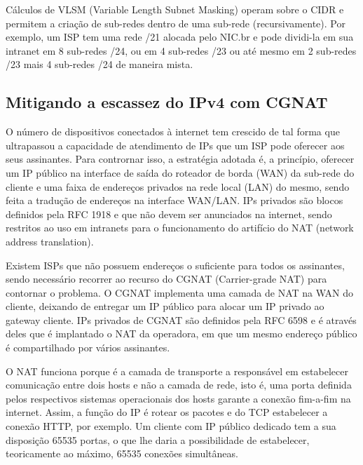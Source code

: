     Cálculos de VLSM (Variable Length Subnet Masking) operam sobre o CIDR e permitem a criação de sub-redes dentro de uma sub-rede (recursivamente). Por exemplo, um ISP tem uma rede /21 alocada pelo NIC.br e pode dividi-la em sua intranet em 8 sub-redes /24, ou em 4 sub-redes /23 ou até mesmo em 2 sub-redes /23 mais 4 sub-redes /24 de maneira mista.

\subsection{Mitigando a escassez do IPv4 com CGNAT}

    O número de dispositivos conectados à internet tem crescido de tal forma que ultrapassou a capacidade de atendimento de IPs que um ISP pode oferecer aos seus assinantes. Para contrornar isso, a estratégia adotada é, a princípio, oferecer um IP público na interface de saída do roteador de borda (WAN) da sub-rede do cliente e uma faixa de endereços privados na rede local (LAN) do mesmo, sendo feita a tradução de endereços na interface WAN/LAN. IPs privados são blocos definidos pela RFC 1918 e que não devem ser anunciados na internet, sendo restritos ao uso em intranets para o funcionamento do artifício do NAT (network address translation).
    
    Existem ISPs que não possuem endereços o suficiente para todos os assinantes, sendo necessário recorrer ao recurso do CGNAT (Carrier-grade NAT) para contornar o problema. O CGNAT implementa uma camada de NAT na WAN do cliente, deixando de entregar um IP público para alocar um IP privado ao gateway cliente. IPs privados de CGNAT são definidos pela RFC 6598 e é através deles que é implantado o NAT da operadora, em que um mesmo endereço público é compartilhado por vários assinantes.

   
   O NAT funciona porque é a camada de transporte a responsável em estabelecer comunicação entre dois hosts e não a camada de rede, isto é, uma porta definida pelos respectivos sistemas operacionais dos hosts garante a conexão fim-a-fim na internet. Assim, a função do IP é rotear os pacotes e do TCP estabelecer a conexão HTTP, por exemplo. Um cliente com IP público dedicado tem a sua disposição 65535 portas, o que lhe daria a possibilidade de estabelecer, teoricamente ao máximo, 65535 conexões simultâneas.
   
